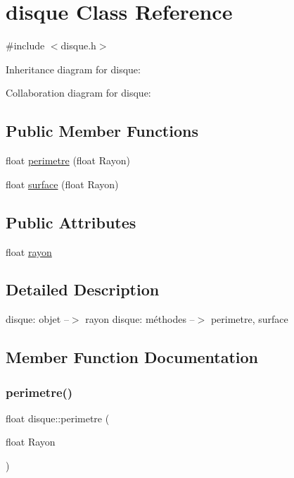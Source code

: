 \hypertarget{classdisque}{}\section{disque Class Reference}
\label{classdisque}


{\ttfamily \#include $<$disque.\+h$>$}



Inheritance diagram for disque\+:


Collaboration diagram for disque\+:
\subsection*{Public Member Functions}
\begin{DoxyCompactItemize}
\item 
float \hyperlink{classdisque_aeae307a8d5ba84e085fb31c9e089e0ab}{perimetre} (float Rayon)
\item 
float \hyperlink{classdisque_ab1db5f6b62c0c1d03569f0c8bf08eaa6}{surface} (float Rayon)
\end{DoxyCompactItemize}
\subsection*{Public Attributes}
\begin{DoxyCompactItemize}
\item 
float \hyperlink{classdisque_ac9ae86ee1309e5fec237632aeb70c0af}{rayon}
\end{DoxyCompactItemize}


\subsection{Detailed Description}
disque\+: objet --$>$ rayon  disque\+: méthodes --$>$ perimetre, surface 

\subsection{Member Function Documentation}
\mbox{\label{classdisque_aeae307a8d5ba84e085fb31c9e089e0ab}} 
\subsubsection{\texorpdfstring{perimetre()}{perimetre()}}
{\footnotesize\ttfamily float disque\+::perimetre (\begin{DoxyParamCaption}\item[{float}]{Rayon }\end{DoxyParamCaption})}

